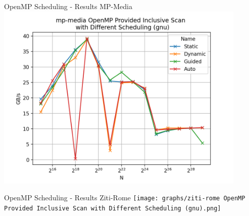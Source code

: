 \begin{frame}{OpenMP Scheduling - Results MP-Media}
	\centering
	\vspace{-5pt}
	\includegraphics[width=0.90\textwidth]{graphs/mp-media OpenMP Provided Inclusive Scan  with Different Scheduling (gnu).png}
\end{frame}

\begin{frame}{OpenMP Scheduling - Results Ziti-Rome}
	\centering
	\vspace{-5pt}
	\texttt{[image: graphs/ziti-rome OpenMP Provided Inclusive Scan  with Different Scheduling (gnu).png]}
\end{frame}
